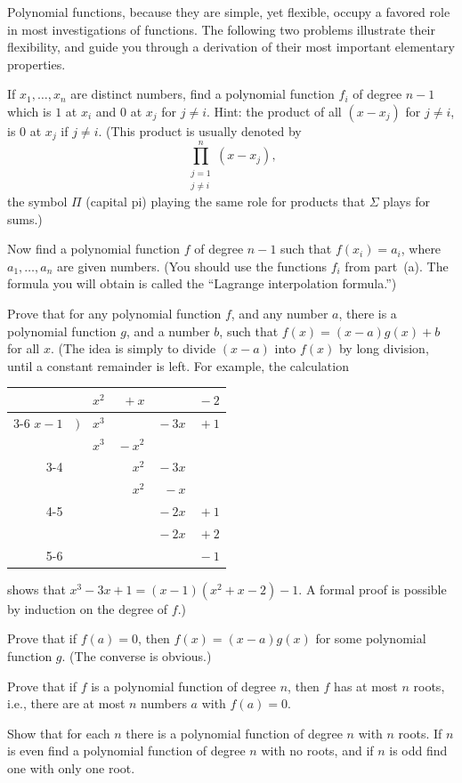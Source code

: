 Polynomial functions, because they are simple, yet flexible, occupy a favored
role in most investigations of functions. The following two problems
illustrate their flexibility, and guide you through a derivation of their most
important elementary properties.

\begin{letters}
\item If $x_1, \dots, x_n$ are distinct numbers, find a polynomial function
$f_i$ of degree $n-1$ which is $1$ at $x_i$ and $0$ at $x_j$ for $j \neq i$.
Hint: the product of all $(x-x_j)$ for $j \neq i$, is $0$ at $x_j$ if
$j \neq i$. (This product is usually denoted by
\[
\prod_{\substack{j=1\\ j\neq i}}^n (x-x_j),
\]
the symbol $\Pi$ (capital pi) playing the same role for products that $\Sigma$
plays for sums.)
\item Now find a polynomial function $f$ of degree $n-1$ such that
$f(x_i)=a_i$, where $a_1, \dots, a_n$ are given numbers. (You should use the
functions $f_i$ from part~(a). The formula you will obtain is called the
``Lagrange interpolation formula.'')
\end{letters}

\begin{letters}
\item Prove that for any polynomial function $f$, and any number $a$, there is
a polynomial function $g$, and a number $b$, such that
$f(x)=(x-a)g(x)+b$ for all $x$. (The idea is simply to divide $(x-a)$ into
$f(x)$ by long division, until a constant remainder is left. For example, the
calculation
\begin{center}
\begin{tabular}{@{}r@{\,}c@{}r@{}r@{}r@{}r@{}}
 && $x^2$ & ${}+x$ && ${}-2$ \\
\cline{3-6}
$x-1$ & $\big)$& $x^3$ && ${}-3x$ & ${}+1$ \\
 && $x^3$ & ${}-x^2$ \\
\cline{3-4}
 &&& $x^2$ & ${}-3x$ \\
 &&& $x^2$ & ${}-x$ \\
\cline{4-5}
 &&&& ${}-2x$ & ${}+1$ \\
 &&&& ${}-2x$ & ${}+2$ \\
\cline{5-6}
 &&&&& ${}-1$
\end{tabular}
\end{center}
shows that $x^3 - 3x + 1 = (x-1)(x^2 + x - 2) - 1$. A formal proof is possible
by induction on the degree of $f$.)
\item Prove that if $f(a)=0$, then $f(x)=(x-a)g(x)$ for some polynomial
function $g$. (The converse is obvious.)
\item Prove that if $f$ is a polynomial function of degree $n$, then $f$ has
at most $n$ roots, i.e., there are at most $n$ numbers $a$ with $f(a)=0$.
\item Show that for each $n$ there is a polynomial function of degree $n$ with
$n$ roots. If $n$ is even find a polynomial function of degree $n$ with no
roots, and if $n$ is odd find one with only one root.
\end{letters}

